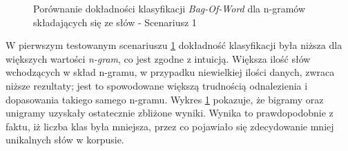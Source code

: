 \begin{figure}[ht!]
	\centering
    \qquad
	\caption{Porównanie dokładności klasyfikacji \textit{Bag-Of-Word} dla n-gramów składających się ze słów - Scenariusz 1}
    \label{fig:bow-ngram-compare-word}
\end{figure}

W pierwszym testowanym scenariuszu \ref{fig:bow-ngram-compare-word} dokładność klasyfikacji była niższa dla większych wartości \textit{n-gram}, co jest zgodne z intuicją. Większa ilość słów wchodzących w skład n-gramu, w przypadku niewielkiej ilości danych, zwraca niższe rezultaty; jest to spowodowane większą trudnością odnalezienia i dopasowania takiego samego n-gramu. Wykres \ref{fig:bow-ngram-compare-word} pokazuje, że bigramy oraz unigramy uzyskały ostatecznie zbliżone wyniki. Wynika to prawdopodobnie z faktu, iż liczba klas była mniejsza, przez co pojawiało się zdecydowanie mniej unikalnych słów w korpusie. 

